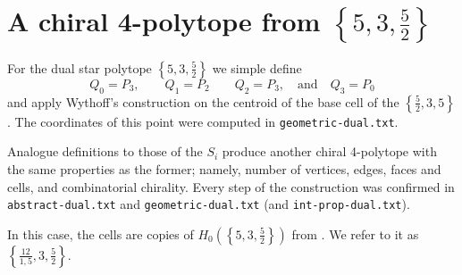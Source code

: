 \documentclass{article}
\theoremstyle{definition}
\begin{document}
	
	\section{A chiral 4-polytope from $\left\{5,3,\frac{5}{2}\right\}$}
	For the dual star polytope $\left\{5,3,\frac{5}{2}\right\}$ we simple define
	\[Q_0=P_3,\qquad Q_1=P_2\qquad Q_2=P_3,\quad\text{and}\quad Q_3=P_0\]
	and apply Wythoff's construction on the centroid of the base cell of the $\left\{\frac{5}{2},3,5\right\}$. The coordinates of this point were computed in \texttt{geometric-dual.txt}.
	
	Analogue definitions to those of the $S_i$ produce another chiral 4-polytope with the same properties as the former; namely, number of vertices, edges, faces and cells, and combinatorial chirality. Every step of the construction was confirmed in \texttt{abstract-dual.txt} and \texttt{geometric-dual.txt} (and \texttt{int-prop-dual.txt}).
	
	In this case, the cells are copies of $H_0(\left\{5,3,\frac{5}{2}\right\})$ from \cite{petcox}. We refer to it as $\left\{\frac{12}{1,5},3,\frac{5}{2}\right\}$.
	
\end{document}
